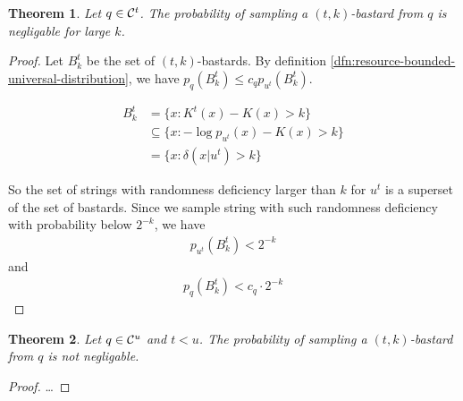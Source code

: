 \documentclass[10pt,a4paper,oneside]{article}
\newtheorem{thm}{Theorem}
\begin{document}
\begin{thm}
Let $q \in {\cal C}^t$. The probability of sampling a $(t, k)$-bastard from $q$ is negligable for large $k$.
\end{thm}
\begin{proof}

Let $B^t_k$ be the set of $(t, k)$-bastards. By definition \ref{dfn:resource-bounded-universal-distribution}, we have $p_q(B^t_k) \leq c_q p_{u^t}(B^t_k)$.

\begin{align*}
B^t_k &= \{x : K^t(x) - K(x) > k\} \\ 
	&\subseteq \{x : - \log p_{u^t}(x) - K(x) > k\} \\
	&= \{x : \delta(x | u^t) > k\}
\end{align*}

So the set of strings with randomness deficiency larger than $k$ for $u^t$ is a superset of the set of bastards. Since we sample string with such randomness deficiency with probability below $2^{-k}$, we have
\begin{align*}
p_{u^t}(B^t_k) < 2^{-k} 
\end{align*}
and 
\begin{align*}
p_q(B^t_k) < c_q \cdot 2^{-k} 
\end{align*}
\end{proof}

\begin{thm}
Let $q \in {\cal C}^u$ and $t < u$. The probability of sampling a $(t, k)$-bastard from $q$ is not negligable.
\end{thm}
\begin{proof}
\ldots
\end{proof}

\nocite{*}


\end{document}
